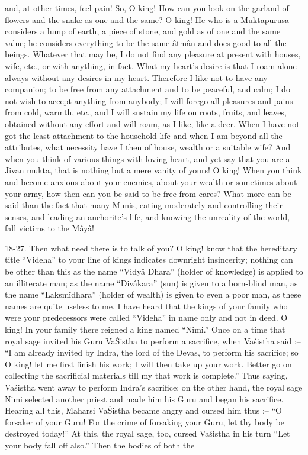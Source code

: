 and, at other times, feel pain! So, O king! How can you look on the garland of flowers and the snake as one and the same? O king! He who is a Muktapurusa considers a lump of earth, a piece of stone, and gold as of one and the same value; he considers everything to be the same \^atm\^an and does good to all the beings. Whatever that may be, I do not find any pleasure at present with houses, wife, etc., or with anything, in fact. What my heart’s desire is that I roam alone always without any desires in my heart. Therefore I like not to have any companion; to be free from any attachment and to be peaceful, and calm; I do not wish to accept anything from anybody; I will forego all pleasures and pains from cold, warmth, etc., and I will sustain my life on roots, fruits, and leaves, obtained without any effort and will roam, as I like, like a deer. When I have not got the least attachment to the household life and when I am beyond all the attributes, what necessity have I then of house, wealth or a suitable wife? And when you think of various things with loving heart, and yet say that you are a Jivan mukta, that is nothing but a mere vanity of yours! O king! When you think and become anxious about your enemies, about your wealth or sometimes about your army, how then can you be said to be free from cares? What more can be said than the fact that many Munis, eating moderately and controlling their senses, and leading an anchorite's life, and knowing the unreality of the world, fall victims to the M\^ay\^a!

18-27. Then what need there is to talk of you? O king! know that the hereditary title ``Videha'' to your line of kings indicates downright insincerity; nothing can be other than this as the name ``Vidy\^a Dhara'' (holder of knowledge) is applied to an illiterate man; as the name ``Div\^akara'' (sun) is given to a born-blind man, as the name ``Laksm\^idhara'' (holder of wealth) is given to even a poor man, as these names are quite useless to me. I have heard that the kings of your family who were your predecessors were called ``Videha'' in name only and not in deed. O king! In your family there reigned a king named ``Nimi.'' Once on a time that royal sage invited his Guru Va\'Sistha to perform a sacrifice, when Va\'sistha said :-- ``I am already invited by Indra, the lord of the Devas, to perform his sacrifice; so O king! let me first finish his work; I will then take up your work. Better go on collecting the sacrificial materials till my that work is complete.'' Thus saying, Va\'sistha went away to perform Indra's sacrifice; on the other hand, the royal sage Nimi selected another priest and made him his Guru and began his sacrifice. Hearing all this, Maharsi Va\'Sistha became angry and cursed him thus :-- ``O forsaker of your Guru! For the crime of forsaking your Guru, let thy body be destroyed today!'' At this, the royal sage, too, cursed Va\'sistha in his turn ``Let your body fall off also.'' Then the bodies of both the

